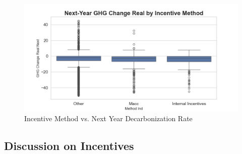 \begin{figure}[H]
\centering
    \includegraphics[width=\textwidth]{figures/ghg_change_real_next_by_method_ind.png}
\caption{Incentive Method vs. Next Year Decarbonization Rate}
\label{fig:ghg_change_real_next_by_method_ind}
\end{figure}

\subsection{Discussion on Incentives}

